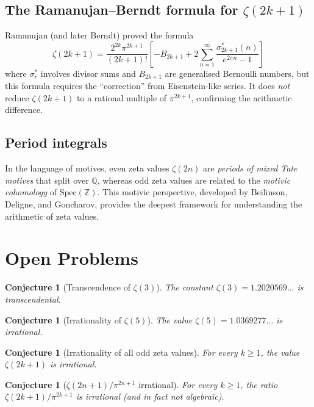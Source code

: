 \documentclass[12pt,a4paper]{amsart}
\newtheorem{conjecture}[theorem]{Conjecture}
\theoremstyle{definition}
\theoremstyle{remark}
\begin{document}
\subsection{The Ramanujan--Berndt formula for $\zeta(2k+1)$}

Ramanujan (and later Berndt) proved the formula
\[
  \zeta(2k+1) = \frac{2^{2k} \pi^{2k+1}}{(2k+1)!}
  \left[
    - B_{2k+1} + 2 \sum_{n=1}^{\infty} \frac{\sigma_{2k+1}^*(n)}{e^{2\pi n} - 1}
  \right]
\]
where $\sigma_r^*$ involves divisor sums and $B_{2k+1}$ are generalised Bernoulli
numbers, but this formula requires the ``correction'' from Eisenstein-like series.
It does \emph{not} reduce $\zeta(2k+1)$ to a rational multiple of $\pi^{2k+1}$,
confirming the arithmetic difference.

\subsection{Period integrals}

In the language of motives, even zeta values $\zeta(2n)$ are \emph{periods of
mixed Tate motives} that split over $\mathbb{Q}$, whereas odd zeta values are
related to the \emph{motivic cohomology} of $\mathrm{Spec}(\mathbb{Z})$. This
motivic perspective, developed by Beilinson, Deligne, and Goncharov, provides
the deepest framework for understanding the arithmetic of zeta values.

\section{Open Problems}

\begin{conjecture}[Transcendence of $\zeta(3)$]
  The constant $\zeta(3) = 1.2020569\ldots$ is transcendental.
\end{conjecture}

\begin{conjecture}[Irrationality of $\zeta(5)$]
  The value $\zeta(5) = 1.0369277\ldots$ is irrational.
\end{conjecture}

\begin{conjecture}[Irrationality of all odd zeta values]
  For every $k \geq 1$, the value $\zeta(2k+1)$ is irrational.
\end{conjecture}

\begin{conjecture}[$\zeta(2n+1)/\pi^{2n+1}$ irrational]
  For every $k \geq 1$, the ratio $\zeta(2k+1)/\pi^{2k+1}$ is irrational (and
  in fact not algebraic).
\end{conjecture}
\end{document}
